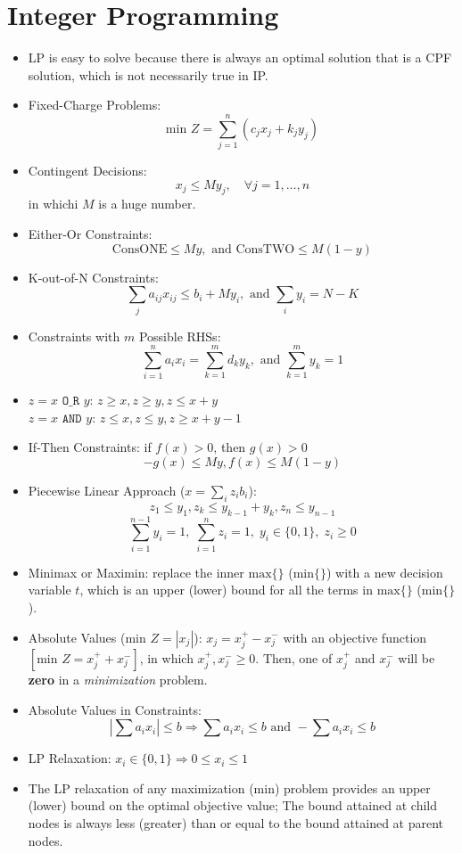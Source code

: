 \documentclass[10pt, twocolumn]{article}
\begin{document}
\section*{Integer Programming}
\begin{itemize}
\item LP is easy to solve because there is always an optimal solution that is a CPF solution, which is not necessarily true in IP. 
\item Fixed-Charge Problems: 
\[ \text{min } Z = \sum_{j=1}^n(c_jx_j+k_jy_j) \]
\item Contingent Decisions: 
\[ x_j \leq My_j, \quad\forall j=1,\dots,n \]
in whichi $M$ is a huge number.
\item Either-Or Constraints: 
\[ \text{ConsONE} \leq My,\text{ and }\text{ConsTWO} \leq M(1-y) \]
\item K-out-of-N Constraints:
\[ \sum_ja_{ij}x_{ij} \leq b_i + My_i,\text{ and }\sum_iy_i = N-K \]
\item Constraints with $m$ Possible RHSs: 
\[ \sum_{i=1}^na_ix_i = \sum_{k=1}^md_ky_k,\text{ and }\sum_{k=1}^my_k=1 \]
\item $z = x \texttt{ O\_R } y$: $z \geq x, z \geq y, z \leq x+y$ \\
$z = x \texttt{ AND } y$: $z \leq x, z \leq y, z \geq x+y-1$ 
\item If-Then Constraints: if $f(x)>0$, then $g(x)>0$
\[ -g(x) \leq My, f(x) \leq M(1-y) \]
\item Piecewise Linear Approach ($x=\sum_iz_ib_i$): 
\[ z_1 \leq y_1, z_{k} \leq y_{k-1} + y_{k}, z_n \leq y_{n-1} \]
\[ \sum_{i=1}^{n-1}y_i = 1,\; \sum_{i=1}^nz_i=1,\; y_i\in\{0,1\},\; z_i\geq 0 \]
\item Minimax or Maximin: replace the inner $\text{max}\{\}$ ($\text{min}\{\}$) with a new decision variable $t$, which is an upper (lower) bound for all the terms in $\text{max}\{\}$ ($\text{min}\{\}$).
\item Absolute Values ($\text{min } Z = |x_j|$): $x_j = x_j^+ - x_j^-$ with an objective function $[\text{min } Z = x_j^+ + x_j^-]$, in which $x_j^+, x_j^- \geq 0$. Then, one of $x_j^+$ and $x_j^-$ will be \textbf{zero} in a \emph{minimization} problem.
\item Absolute Values in Constraints: 
\[ \left|\sum a_ix_i\right| \leq b \Rightarrow \sum a_ix_i \leq b \text{ and } -\sum a_ix_i \leq b \]
\item LP Relaxation: $x_i\in\{0,1\} \Rightarrow 0 \leq x_i \leq 1$
\item The LP relaxation of any maximization (min) problem provides an upper (lower) bound on the optimal objective value; The bound attained at child nodes is always less (greater) than or equal to the bound attained at parent nodes.

\end{itemize}
\end{document}
